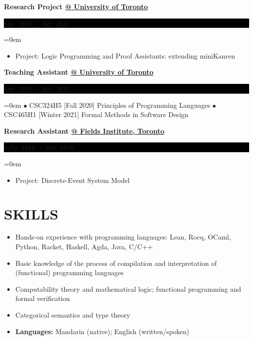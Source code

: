 \documentclass[fontsize=11pt]{article}
\newcommand{\NewPart}[1]{\section*{\uppercase{#1}}}
\newcommand{\SkillEntry}[2]{       %
    \noindent \textbf{#1} \hfill      %
        \noindent \textit{#2} \par        %
}
\newcommand{\SkillsEntry}[4]{       %
    \noindent \textbf{#1} \hfill      %
        \noindent \textit{#2} \par        %
    \noindent\hangindent=2em\hangafter=0 \small #4 %
    \normalsize \par}
\newcommand{\EducationEntry}[4]{
    \noindent \textbf{#1} \hfill      %
    \colorbox{Black}{ 
      \parbox{11em}{
      \centering \color{White}#2}} \par  %
    \noindent \textit{#3} \par        %
    \noindent\hangindent=0em\hangafter=0 \small #4 %
    \normalsize \par}
\newcommand{\WorkEntry}[4]{       %
    \noindent \textbf{#1} \hfill      %
    \colorbox{Black}{%
      \parbox{11em}{%
      \centering\color{White}#2}} \par   %
    \noindent\hangindent=0em\hangafter=0 \small #4 %
    \normalsize \par}
\begin{document}
\WorkEntry
{Research Project \underline{@ University of Toronto}}
{\texttt{Sep 2020 - Apr 2021}}
{}
{\begin{itemize} \itemsep -1pt
    \item Project: Logic Programming and Proof Assistants: extending miniKanren
    \end{itemize}}

\WorkEntry
{Teaching Assistant \underline{@ University of Toronto}}
{\texttt{Sep 2020 - Apr 2021}}
{}
{$\bullet$ CSC324H5 [Fall 2020] Principles of Programming Languages $\bullet$ CSC465H1 [Winter 2021] Formal Methods in Software Design
}
    




\WorkEntry
{Research Assistant \underline{@ Fields Institute, Toronto}}
{\texttt{July 2018 - Sep 2018}}
{}
{\begin{itemize} \itemsep -1pt
    \item Project: Discrete-Event System Model
    \end{itemize}}



\NewPart{Skills}{}
\begin{itemize} \itemsep -1pt
  \item Hands-on experience with programming languages: Lean, Rocq, OCaml, Python, Racket, Haskell, Agda, Java, C/C++
  \item Basic knowledge of the process of compilation and interpretation of (functional) programming languages
  \item
  Computability theory and mathematical logic; functional programming and formal verification
  \item Categorical semantics and type theory
  \item \textbf{Languages:} Mandarin (native); English (written/spoken)
\end{itemize}
\end{document}
